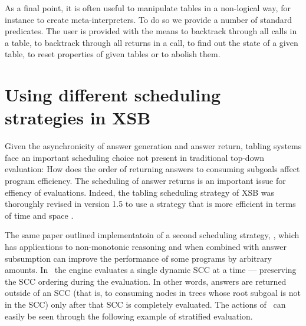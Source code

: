 As a final point, it is often useful to manipulate tables in a
non-logical way, for instance to create meta-interpreters.  To do so
we provide a number of standard predicates.  The user is provided with
the means to backtrack through all calls in a table, to backtrack
through all returns in a call, to find out the state of a given table,
to reset properties of given tables or to abolish them.

\section{Using different scheduling strategies in XSB}

Given the asynchronicity of answer generation and answer return,
tabling systems face an important scheduling choice not present in
traditional top-down evaluation: How does the order of returning
answers to consuming subgoals affect program efficiency.  The
scheduling of answer returns is an important issue for effiency of
evaluations.  Indeed, the tabling scheduling strategy of XSB was
thoroughly revised in version 1.5 to use a strategy that is more
efficient in terms of time and space \cite{JFLP-Scheduling}.

The same paper outlined implementatoin of a second scheduling
strategy, \localsched, which has applications to non-monotonic
reasoning and when combined with answer subsumption can improve the
performance of some programs by arbitrary amounts. In \localsched\ the
engine evaluates a single dynamic SCC at a time --- preserving the SCC
ordering during the evaluation.  In other words, answers are returned
outside of an SCC (that is, to consuming nodes in trees whose root
subgoal is not in the SCC) only after that SCC is completely
evaluated.  The actions of \localsched\ can easily be seen through the
following example of stratified evaluation.

